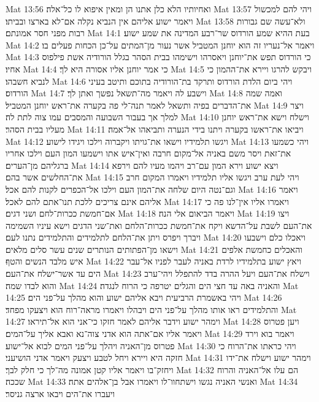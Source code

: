 Mat 13:56  ואחיותיו הלא כלן אתנו הן ומאין איפוא לו כל־אלה׃
Mat 13:57  ויהי להם למכשול ויאמר ישוע אליהם אין הנביא נקלה אם־לא בארצו ובביתו׃
Mat 13:58  ולא־עשה שם גבורות רבות מפני חסר אמונתם׃
Mat 14:1  בעת ההיא שמע הורדוס שר־רבע המדינה את שמע ישוע׃
Mat 14:2  ויאמר אל־נעריו זה הוא יוחנן המטביל אשר נעור מן־המתים על־כן הכחות פעלים בו׃
Mat 14:3  כי הורדוס תפש את־יוחנן ויאסרהו וישימהו בבית הסהר בגלל הורודיה אשת פילפוס אחיו׃
Mat 14:4  כי אמר יוחנן אליו אסורה היא לך׃
Mat 14:5  ויבקש להרגו ויירא את־ההמון כי לנביא חשבהו׃
Mat 14:6  ויהי ביום הלדת הורדוס ותרקד בת־הורודיה בתוכם ותיטב בעיני הורדוס׃
Mat 14:7  וישבע לה ויאמר מה־תשאל נפשך ואתן לך׃
Mat 14:8  ואמה שמה את־הדברים בפיה ותשאל לאמר תנה־לי פה בקערה את־ראש יוחנן המטביל׃
Mat 14:9  ויצר למלך אך בעבור השבועה והמסבים עמו צוה לתת לה׃
Mat 14:10  וישלח וישא את־ראש יוחנן מעליו בבית הסהר׃
Mat 14:11  ויביאו את־ראשו בקערה ויתנו בידי הנערה ותביאהו אל־אמה׃
Mat 14:12  ויגשו תלמידיו וישאו את־גויתו ויקברוה וילכו ויגידו לישוע׃
Mat 14:13  ויהי כשמעו את־זאת ויסר משם באניה אל־מקום חרבה ואין־איש אתו וישמעו המון העם וילכו אחריו ברגליהם מן־הערים׃
Mat 14:14  ויצא ישוע וירא המון עם־רב ויהמו מעיו להם וירפא את־החלשים אשר בהם׃
Mat 14:15  ויהי לעת ערב ויגשו אליו תלמידיו ויאמרו המקום חרב וגם־נטה היום שלחה את־המון העם וילכו אל־הכפרים לקנות להם אכל׃
Mat 14:16  ויאמר אליהם אינם צריכים ללכת תנו־אתם להם לאכל׃
Mat 14:17  ויאמרו אליו אין־לנו פה כי אם־חמשת ככרות־לחם ושני דגים׃
Mat 14:18  ויאמר הביאום אלי הנה׃
Mat 14:19  ויצו את־העם לשבת על־הדשא ויקח את־חמשת ככרות־הלחם ואת־שני הדגים וישא עיניו השמימה ויברך ויפרס ויתן את־הלחם לתלמידים והתלמידים נתנו לעם׃
Mat 14:20  ויאכלו כלם וישבעו וישאו מן־הפתותים הנותרים שנים עשר סלים מלאים׃
Mat 14:21  והאכלים כחמשת אלפים איש מלבד הנשים והטף׃
Mat 14:22  ויאץ ישוע בתלמידיו לרדת באניה לעבר לפניו אל־עבר הים עד אשר־ישלח את־העם׃
Mat 14:23  וישלח את־העם ויעל ההרה בדד להתפלל ויהי־ערב והוא לבדו שמה׃
Mat 14:24  והאניה באה עד חצי הים והגלים יטרפה כי הרוח לנגדה׃
Mat 14:25  ויהי באשמרת הרביעית ויבא אליהם ישוע והוא מהלך על־פני הים׃
Mat 14:26  והתלמידים ראו אותו מהלך על־פני הים ויבהלו ויאמרו מראה־רוח הוא ויצעקו מפחד׃
Mat 14:27  וימהר ישוע וידבר אליהם לאמר חזקו כי־אני הוא אל־תיראו׃
Mat 14:28  ויען פטרוס ויאמר אליו אם־אתה הוא אדני צוה־נא ואבא אליך על־המים׃
Mat 14:29  ויאמר בוא וירד פטרוס מן־האניה ויהלך על־פני המים לבוא אל־ישוע׃
Mat 14:30  ויהי כראתו את־הרוח כי חזקה היא ויירא ויחל לטבע ויצעק ויאמר אדני הושיעני׃
Mat 14:31  וימהר ישוע וישלח את־ידו ויחזק־בו ויאמר אליו קטן אמונה מה־לך כי חלק לבך׃
Mat 14:32  הם עלו אל־האניה והרוח שככה׃
Mat 14:33  ואנשי האניה נגשו וישתחוו־לו ויאמרו אבל בן־אלהים אתה׃
Mat 14:34  ויעברו את־הים ויבאו ארצה גניסר׃
